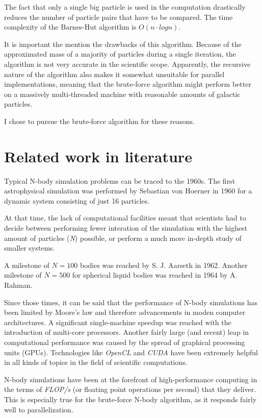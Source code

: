 \documentclass[12pt]{article}
\begin{document}
The fact that only a single big particle is used in the computation drastically reduces the number of particle pairs that have to be compared. The time complexity of the Barnes-Hut algorithm is $O(n \cdot logn)$.

It is important the mention the drawbacks of this algorithm. Because of the approximated mass of a majority of particles during a single iteration, the algorithm is not very accurate in the scientific scope. Apparently, the recursive nature of the algorithm also makes it somewhat unsuitable for parallel implementations, meaning that the brute-force algorithm might perform better on a massively multi-threaded machine with reasonable amounts of galactic particles.

I chose to pursue the brute-force algorithm for these reasons. 

\section{Related work in literature}

Typical N-body simulation problems can be traced to the 1960s. The first astrophysical simulation was performed by Sebastian von Hoerner in 1960 for a dynamic system consisting of just 16 particles. \cite{camb_book}

At that time, the lack of computational facilities meant that scientists had to decide between performing fewer interation of the simulation with the highest amount of particles (\textit{N}) possible, or perform a much more in-depth study of smaller systems.\cite{camb_book}

A milestone of $N=100$ bodies was reached by S. J. Aarseth in 1962. Another milestone of $N=500$ for spherical liquid bodies was reached in 1964 by A. Rahman. \cite{history}

Since those times, it can be said that the performance of N-body simulations has been limited by Moore’s law and therefore advancements in moden computer architectures. A significant single-machine speedup was reached with the introduction of multi-core processors. Another fairly large (and recent) leap in computational performance was caused by the spread of graphical processing units (GPUs). Technologies like \textit{OpenCL} and \textit{CUDA} have been extremely helpful in all kinds of topics in the field of scientific computations.

N-body simulations have been at the forefront of high-performance computing in the terms of \textit{FLOP/s} (or floating point operations per second) that they deliver.\cite{history} This is especially true for the brute-force N-body algorithm, as it responds fairly well to parallelization. 
\end{document}
